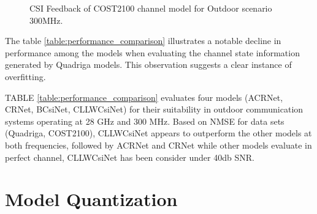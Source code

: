 \documentclass[lettersize,journal]{IEEEtran}
\begin{document}
	\begin{figure}[ht]
		\centering
		\hfill
		\hfill
		\caption{CSI Feedback of COST2100 channel model for Outdoor scenario 300MHz.}
		\label{fig:cost2100_300mhz}
	\end{figure}
	









The table \ref{table:performance_comparison} illustrates a notable decline in performance among the models when evaluating the channel state information generated by Quadriga models. This observation suggests a clear instance of overfitting.

TABLE \ref{table:performance_comparison} evaluates four models (ACRNet, CRNet, BCsiNet, CLLWCsiNet) for their suitability in outdoor communication systems operating at 28 GHz and 300 MHz. Based on NMSE for data sets (Quadriga, COST2100), CLLWCsiNet appears to outperform the other models at both frequencies, followed by ACRNet and CRNet while other models evaluate in perfect channel, CLLWCsiNet has been consider under 40db SNR.

\section{Model Quantization}
\end{document}
